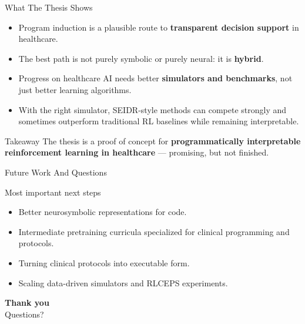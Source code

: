 \documentclass[aspectratio=169,11pt]{beamer}
\newcommand{\takeaway}[1]{%
  \begin{alertblock}{Takeaway}
    #1
  \end{alertblock}
}
\begin{document}
\begin{frame}{What The Thesis Shows}
  \begin{itemize}
    \item Program induction is a plausible route to \textbf{transparent decision support} in healthcare.
    \item The best path is not purely symbolic or purely neural: it is \textbf{hybrid}.
    \item Progress on healthcare AI needs better \textbf{simulators and benchmarks}, not just better learning algorithms.
    \item With the right simulator, SEIDR-style methods can compete strongly and sometimes outperform traditional RL baselines while remaining interpretable.
  \end{itemize}

  \vspace{0.3cm}

  \takeaway{The thesis is a proof of concept for \textbf{programmatically interpretable reinforcement learning in healthcare} --- promising, but not finished.}
\end{frame}

\begin{frame}{Future Work And Questions}
  \begin{block}{Most important next steps}
    \begin{itemize}
      \item Better neurosymbolic representations for code.
      \item Intermediate pretraining curricula specialized for clinical programming and protocols.
      \item Turning clinical protocols into executable form.
      \item Scaling data-driven simulators and RLCEPS experiments.
    \end{itemize}
  \end{block}

  \vfill

  \centering
  {\Huge \textbf{Thank you}}\\[0.25cm]
  {\Large Questions?}
\end{frame}
\end{document}
